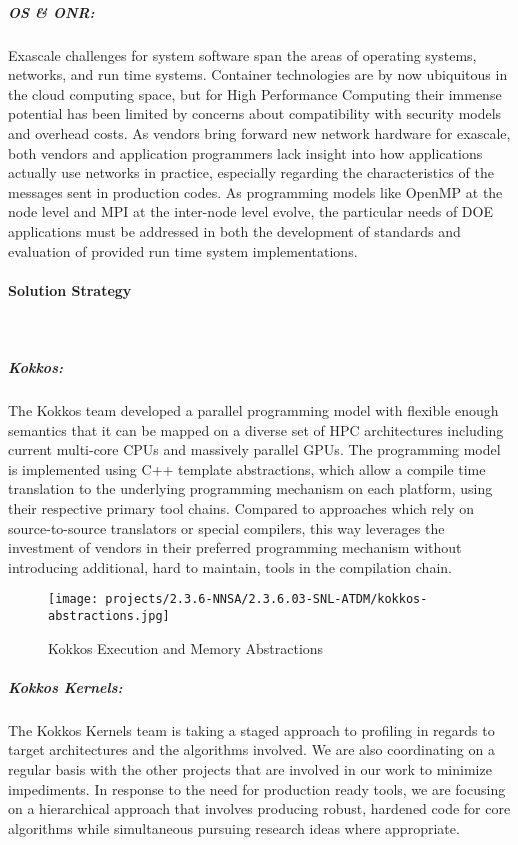 \subparagraph{OS \& ONR:} Exascale challenges for system software span the areas of operating systems, networks, and run time systems.  Container technologies are by now ubiquitous in the cloud computing space, but for High Performance Computing their immense potential has been limited by concerns about compatibility with security models and overhead costs.  As vendors bring forward new network hardware for exascale, both vendors and application programmers lack insight into how applications actually use networks in practice, especially regarding the characteristics of the messages sent in production codes.  As programming models like OpenMP at the node level and MPI at the inter-node level evolve, the particular needs of DOE applications must be addressed in both the development of standards and evaluation of provided run time system implementations.



\paragraph{Solution Strategy} \leavevmode \\

\subparagraph{Kokkos: } The Kokkos team developed a parallel programming model with flexible enough semantics that it can be mapped on a diverse set of HPC architectures including current multi-core CPUs and massively parallel GPUs.
The programming model is implemented using C++ template abstractions, which allow a compile time translation to the underlying programming mechanism on each platform, using their respective primary tool chains.
Compared to approaches which rely on source-to-source translators or special compilers, this way leverages the investment of vendors in their preferred programming mechanism without introducing additional, hard to maintain, tools in the compilation chain.

\begin{figure}[ht!]
\centering
\texttt{[image: projects/2.3.6-NNSA/2.3.6.03-SNL-ATDM/kokkos-abstractions.jpg]}
\caption{Kokkos Execution and Memory Abstractions}
\end{figure}

\subparagraph{Kokkos Kernels:} The Kokkos Kernels team is taking a staged approach to profiling in regards to target architectures and the algorithms involved. We are also coordinating on a regular basis with the other projects that are involved in our work to minimize impediments. In response to the need for production ready tools, we are focusing on a hierarchical approach that involves producing robust, hardened code for core algorithms while simultaneous pursuing research ideas where appropriate. 
 
